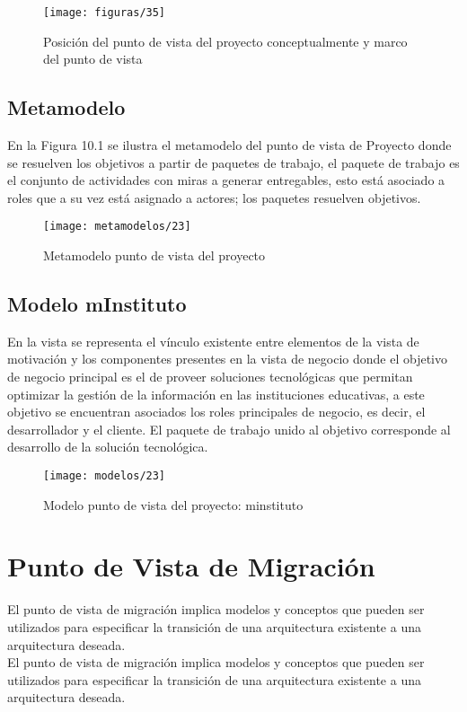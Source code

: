   \begin{figure}[H]
	\centering
	\texttt{[image: figuras/35]}
	\captionsetup{width=.95\textwidth}
	\caption{Posición del punto de vista del proyecto conceptualmente y marco del punto de vista}
	\label{figura35}
  \end{figure}

  \subsection{Metamodelo}
  En la Figura 10.1 se ilustra el metamodelo del punto de vista de Proyecto donde se resuelven los objetivos a partir de paquetes de trabajo, el paquete de trabajo es el conjunto de actividades con miras a generar entregables, esto está asociado a roles que a su vez está asignado a actores; los paquetes resuelven objetivos.

  \begin{figure}[H]
	\centering
	\texttt{[image: metamodelos/23]}
	\captionsetup{width=.95\textwidth}
	\caption{Metamodelo punto de vista del proyecto}
	\label{metamodelo23}
  \end{figure}

  \subsection{Modelo mInstituto}
  En la vista se representa el vínculo existente entre elementos de la vista de motivación y los componentes presentes en la vista de negocio donde el objetivo de negocio principal es el de proveer soluciones tecnológicas que permitan optimizar la gestión de la información en las instituciones educativas, a este objetivo se encuentran asociados los roles principales de negocio, es decir, el desarrollador y el cliente.  El paquete de trabajo unido al objetivo corresponde al desarrollo de la solución tecnológica.
  
  \begin{figure}[H]
	\centering
	\texttt{[image: modelos/23]}
	\captionsetup{width=.95\textwidth}
	\caption{Modelo punto de vista del proyecto: minstituto}
	\label{modelo23}
  \end{figure}
  
\section{Punto de Vista de Migración}
El punto de vista de migración implica modelos y conceptos que pueden ser utilizados para especificar la transición de una arquitectura existente a una arquitectura deseada. \\
El punto de vista de migración implica modelos y conceptos que pueden ser utilizados para especificar la transición de una arquitectura existente a una arquitectura deseada.

